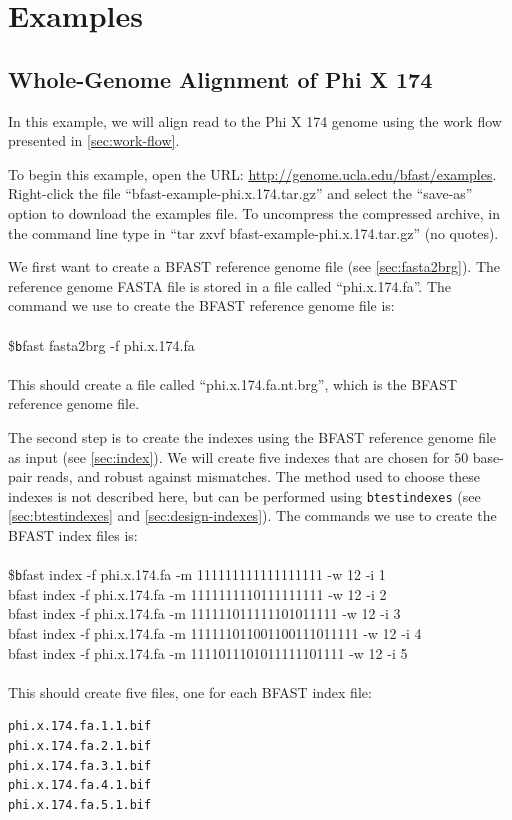 \documentclass[a4paper,12pt]{book}
\newcommand{\TT}[1]{{\tt #1}} %
\newenvironment{script}{\\\\\footnotesize\$\TT}{\normalsize\\\\}
\newcommand{\rGFF}{reference genome FASTA file}
\newcommand{\BRGF}{BFAST reference genome file} %
\newcommand{\BIF}{BFAST index file} %
\begin{document}
\chapter{Examples}
\section{Whole-Genome Alignment of Phi X 174}
\label{sec:phi}
In this example, we will align read to the Phi X 174 genome using the work flow presented in \autoref{sec:work-flow}.

To begin this example, open the URL: \url{http://genome.ucla.edu/bfast/examples}.
Right-click the file ``bfast-example-phi.x.174.tar.gz'' and select the ``save-as'' option to download the examples file.
To uncompress the compressed archive, in the command line type in ``tar zxvf bfast-example-phi.x.174.tar.gz'' (no quotes).

We first want to create a \BRGF{} (see \autoref{sec:fasta2brg}).
The \rGFF{} is stored in a file called ``phi.x.174.fa''.
The command we use to create the \BRGF{} is:
\begin{script}
	bfast fasta2brg -f phi.x.174.fa 
\end{script}
This should create a file called ``phi.x.174.fa.nt.brg'', which is the \BRGF{}.

The second step is to create the indexes using the \BRGF{} as input (see \autoref{sec:index}).
We will create five indexes that are chosen for $50$ base-pair reads, and robust against mismatches.
The method used to choose these indexes is not described here, but can be performed using \TT{btestindexes} (see \autoref{sec:btestindexes} and \autoref{sec:design-indexes}).
The commands we use to create the \BIF{s} is:
\begin{script}
	bfast index -f phi.x.174.fa -m 111111111111111111 -w 12 -i 1
	\\
	bfast index -f phi.x.174.fa -m 1111111110111111111 -w 12 -i 2
	\\
	bfast index -f phi.x.174.fa -m 111111011111101011111 -w 12 -i 3
	\\
	bfast index -f phi.x.174.fa -m 111111011001100111011111 -w 12 -i 4
	\\
	bfast index -f phi.x.174.fa -m 1111011101011111101111 -w 12 -i 5
\end{script}
This should create five files, one for each \BIF{}:
\begin{verbatim}
phi.x.174.fa.1.1.bif
phi.x.174.fa.2.1.bif
phi.x.174.fa.3.1.bif
phi.x.174.fa.4.1.bif
phi.x.174.fa.5.1.bif
\end{verbatim}
\end{document}
